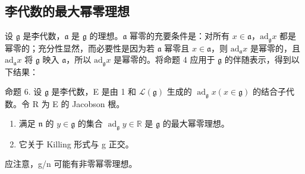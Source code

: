 \subsection{李代数的最大幂零理想}

设 \(\mathfrak{g}\) 是李代数，\(\mathfrak{a}\) 是 \(\mathfrak{g}\) 的理想。\(\mathfrak{a}\) 幂零的充要条件是：对所有 \(x \in \mathfrak{a}\)，\(\mathrm{ad}_{\mathfrak{g}}x\) 都是幂零的；充分性显然，而必要性是因为若 \(\mathfrak{a}\) 幂零且 \(x \in \mathfrak{a}\)，则 \(\mathrm{ad}_{\mathfrak{a}}x\) 是幂零的，且 \(\mathrm{ad}_{\mathfrak{a}}x\) 将 \(\mathfrak{g}\) 映入 \(\mathfrak{a}\)，所以 \(\mathrm{ad}_{\mathfrak{g}}x\) 是幂零的。将命题 4 应用于 \(\mathfrak{g}\) 的伴随表示，得到以下结果：

命题 6. 设 \(\mathfrak{g}\) 是李代数，E 是由 1 和 \(\mathcal{L}(\mathfrak{g})\) 生成的 \(\operatorname{ad}_{\mathfrak{g}}x(x\in \mathfrak{g})\) 的结合子代数。令 R 为 E 的 Jacobson 根。

\begin{enumerate}
\def\labelenumi{(\alph{enumi})}
\item
  满足 \(\mathfrak{n}\) 的 \(y\in \mathfrak{g}\) 的集合 \(\operatorname {ad}_{\mathfrak{g}}y\in \mathbb{R}\) 是 \(\mathfrak{g}\) 的最大幂零理想。
\item
  它关于 Killing 形式与 g 正交。
\end{enumerate}

应注意，g/n 可能有非零幂零理想。

